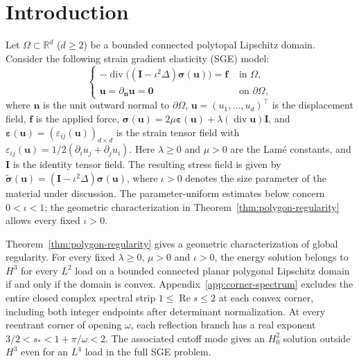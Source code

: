 \documentclass[10pt]{amsart}
\renewcommand{\div}{\operatorname{div}}
\numberwithin{equation}{section}
\begin{document}

\maketitle

\section{Introduction}
Let $\Omega\subset \mathbb{R}^d$ ($d\geq2$) be a bounded connected polytopal Lipschitz domain. Consider the following strain gradient elasticity (SGE) model:
\begin{equation}
\begin{cases}\label{eq:straingradproblem}
-\div\big((\boldsymbol I-\iota^2\Delta)\boldsymbol\sigma(\boldsymbol u)\big)=\boldsymbol f & \textrm{ in }  \Omega,\\
\boldsymbol u=\partial_{\boldsymbol n}\boldsymbol u=\boldsymbol0 & \textrm{ on } \partial\Omega,
\end{cases}
\end{equation}
where $\boldsymbol n$ is the unit outward normal to $\partial\Omega$, $\boldsymbol u=(u_1, \ldots, u_d)^{\intercal}$ is the displacement field, $\boldsymbol f$ is the applied force, $\boldsymbol\sigma(\boldsymbol u)=2\mu\boldsymbol\varepsilon(\boldsymbol u)+\lambda(\div\boldsymbol u)\boldsymbol I$, and $\boldsymbol\varepsilon(\boldsymbol u)=(\varepsilon_{ij}(\boldsymbol u))_{d\times d}$ is the strain tensor field with
$
\varepsilon_{ij}(\boldsymbol u)=1/2(\partial_i u_j+\partial_ju_i).
$
Here $\lambda\ge0$ and $\mu>0$ are the Lam\'e constants, and $\boldsymbol I$ is the identity tensor field. The resulting stress field is given by $\tilde{\boldsymbol\sigma}(\boldsymbol u)=(\boldsymbol I-\iota^2\Delta)\boldsymbol\sigma(\boldsymbol u)$, where $\iota>0$ denotes the size parameter of the material under discussion. The parameter-uniform estimates below concern $0<\iota<1$; the geometric characterization in Theorem~\ref{thm:polygon-regularity} allows every fixed $\iota>0$.

Theorem~\ref{thm:polygon-regularity} gives a geometric characterization of global regularity. For every fixed $\lambda\geq0$, $\mu>0$ and $\iota>0$, the energy solution belongs to $H^3$ for every $L^2$ load on a bounded connected planar polygonal Lipschitz domain if and only if the domain is convex. Appendix~\ref{app:corner-spectrum} excludes the entire closed complex spectral strip $1\leq\operatorname{Re}s\leq2$ at each convex corner, including both integer endpoints after determinant normalization. At every reentrant corner of opening $\omega$, each reflection branch has a real exponent $3/2<s_\ast<1+\pi/\omega<2$. The associated cutoff mode gives an $H_0^2$ solution outside $H^3$ even for an $L^4$ load in the full SGE problem.
\end{document}
